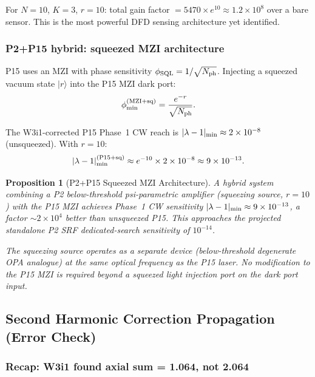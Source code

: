 \documentclass[11pt,twocolumn]{article}
\newcommand{\lam}{\lambda}
\newtheorem{proposition}{Proposition}
\begin{document}
For $N = 10$, $K = 3$, $r = 10$: total gain factor
$= 5470 \times e^{10} \approx 1.2\times10^8$ over a bare sensor.
This is the most powerful DFD sensing architecture yet identified.

\subsubsection{P2+P15 hybrid: squeezed MZI architecture}
\label{sec:squeezing_p15}

P15 uses an MZI with phase sensitivity $\phi_{\rm SQL} = 1/\sqrt{N_{\rm ph}}$.
Injecting a squeezed vacuum state $|r\rangle$ into the P15 MZI dark port:
\begin{equation}
\phi_{\rm min}^{\rm (MZI+sq)} = \frac{e^{-r}}{\sqrt{N_{\rm ph}}}.
\label{eq:mzi_squeezed}
\end{equation}

The W3i1-corrected P15 Phase~1 CW reach is $|\lam-1|_{\rm min} \approx
2\times10^{-8}$ (unsqueezed). With $r = 10$:
\begin{equation}
|\lam-1|_{\rm min}^{\rm (P15+sq)} \approx e^{-10} \times 2\times10^{-8}
\approx 9\times10^{-13}.
\label{eq:p15_sq_reach}
\end{equation}

\begin{proposition}[P2+P15 Squeezed MZI Architecture]
\label{prop:hybrid}
A hybrid system combining a P2 below-threshold psi-parametric
amplifier (squeezing source, $r = 10$) with the P15 MZI achieves
Phase~1 CW sensitivity $|\lam-1|_{\rm min} \approx 9\times10^{-13}$,
a factor $\sim 2\times10^4$ better than unsqueezed P15. This
approaches the projected standalone P2 SRF dedicated-search
sensitivity of $10^{-14}$.

The squeezing source operates as a separate device (below-threshold
degenerate OPA analogue) at the same optical frequency as the P15
laser. No modification to the P15 MZI is required beyond a squeezed
light injection port on the dark port input.
\end{proposition}

\subsection{Second Harmonic Correction Propagation (Error Check)}
\label{sec:error_check}

\subsubsection{Recap: W3i1 found axial sum = 1.064, not 2.064}
\end{document}
